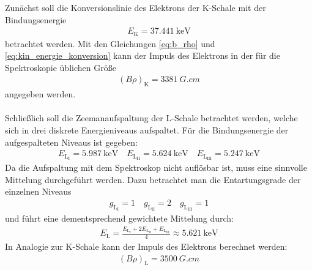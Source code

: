 \documentclass[11pt, a4paper]{article}
\numberwithin{equation}{section}
\begin{document}
Zunächst soll die Konversionslinie des Elektrons der K-Schale mit der Bindungsenergie
\begin{align*}
E_\mathrm{K} = \SI{37,441}{\kilo\electronvolt}
\end{align*}
betrachtet werden.
Mit den Gleichungen \eqref{eq:b_rho} und \eqref{eq:kin_energie_konversion} kann der Impuls des Elektrons in der für die Spektroskopie üblichen Größe
\begin{align*}
	\left(B \rho \right)_\mathrm{K} = \SI{3381}{G.cm}
\end{align*}
angegeben werden.
\\
\\
Schließlich soll die Zeemanaufspaltung der L-Schale betrachtet werden, welche sich in drei diskrete Energieniveaus aufspaltet.
Für die Bindungsenergie der aufgespalteten Niveaus ist gegeben:
\begin{align*}
E_{\mathrm{L}_{\mathrm{I}}} = \SI{5,987}{\kilo\electronvolt} \quad
E_{\mathrm{L}_{\mathrm{II}}} = \SI{5,624}{\kilo\electronvolt} \quad
E_{\mathrm{L}_{\mathrm{III}}} = \SI{5,247}{\kilo\electronvolt}
\end{align*}
Da die Aufspaltung mit dem Spektroskop nicht auflösbar ist, muss eine sinnvolle Mittelung durchgeführt werden.
Dazu betrachtet man die Entartungsgrade der einzelnen Niveaus
\begin{align*}
g_{\mathrm{L}_{\mathrm{I}}} = \num{1} \quad
g_{\mathrm{L}_{\mathrm{II}}} = \num{2} \quad
g_{\mathrm{L}_{\mathrm{III}}} = \num{1}
\end{align*}
und führt eine dementsprechend gewichtete Mittelung durch:
\begin{align*}
E_\mathrm{L} = \frac{E_{\mathrm{L}_{\mathrm{I}}} + 2E_{\mathrm{L}_{\mathrm{II}}} + E_{\mathrm{L}_{\mathrm{III}}}}{4} \approx \SI{5,621}{\kilo\electronvolt}
\end{align*}
In Analogie zur K-Schale kann der Impuls des Elektrons berechnet werden:
\begin{align}
\left(B \rho \right)_\mathrm{L} = \SI{3500}{G.cm}
\end{align}
\end{document}

